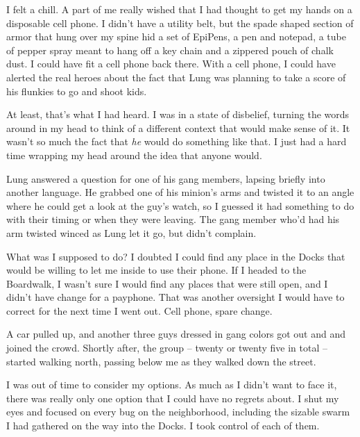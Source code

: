 





I felt a chill.  A part of me really wished that I had thought to get my hands on a disposable cell phone.  I didn't have a utility belt, but the spade shaped section of armor that hung over my spine hid a set of EpiPens, a pen and notepad, a tube of pepper spray meant to hang off a key chain and a zippered pouch of chalk dust.  I could have fit a cell phone back there.  With a cell phone, I could have alerted the real heroes about the fact that Lung was planning to take a score of his flunkies to go and shoot kids.



At least, that's what I had heard.  I was in a state of disbelief, turning the words around in my head to think of a different context that would make sense of it.  It wasn't so much the fact that \emph{he} would do something like that.  I just had a hard time wrapping my head around the idea that anyone would.



Lung answered a question for one of his gang members, lapsing briefly into another language.  He grabbed one of his minion's arms and twisted it to an angle where he could get a look at the guy's watch, so I guessed it had something to do with their timing or when they were leaving.  The gang member who'd had his arm twisted winced as Lung let it go, but didn't complain.



What was I supposed to do?  I doubted I could find any place in the Docks that would be willing to let me inside to use their phone.  If I headed to the Boardwalk, I wasn't sure I would find any places that were still open, and I didn't have change for a payphone. That was another oversight I would have to correct for the next time I went out.  Cell phone, spare change.



A car pulled up, and another three guys dressed in gang colors got out and and joined the crowd.  Shortly after, the group – twenty or twenty five in total – started walking north, passing below me as they walked down the street.



I was out of time to consider my options.  As much as I didn't want to face it, there was really only one option that I could have no regrets about.  I shut my eyes and focused on every bug on the neighborhood, including the sizable swarm I had gathered on the way into the Docks.  I took control of each of them.



